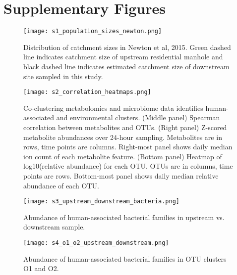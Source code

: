 \section{Supplementary Figures}

\begin{figure}[h]
\begin{center}
    \texttt{[image: s1\_population\_sizes\_newton.png]}
    \caption{Distribution of catchment sizes in Newton et al, 2015. Green dashed line indicates catchment size of upstream residential manhole and black dashed line indicates estimated catchment size of downstream site sampled in this study.}\label{24hr:figS1}
\end{center}
\end{figure}

\begin{figure}[h]
\begin{center}
    \texttt{[image: s2\_correlation\_heatmaps.png]}
    \caption{Co-clustering metabolomics and microbiome data identifies human-associated and environmental clusters. (Middle panel) Spearman correlation between metabolites and OTUs. (Right panel) Z-scored metabolite abundances over 24-hour sampling. Metabolites are in rows, time points are columns. Right-most panel shows daily median ion count of each metabolite feature. (Bottom panel) Heatmap of log10(relative abundance) for each OTU. OTUs are in columns, time points are rows. Bottom-most panel shows daily median relative abundance of each OTU.}\label{24hr:figS2}
\end{center}
\end{figure}

\begin{figure}[h]
\begin{center}
    \texttt{[image: s3\_upstream\_downstream\_bacteria.png]}
    \caption{Abundance of human-associated bacterial families in upstream vs. downstream sample.}\label{24hr:figS3}
\end{center}
\end{figure}

\begin{figure}[h]
\begin{center}
    \texttt{[image: s4\_o1\_o2\_upstream\_downstream.png]}
    \caption{Abundance of human-associated bacterial families in OTU clusters O1 and O2.}\label{24hr:figS4}
\end{center}
\end{figure}
